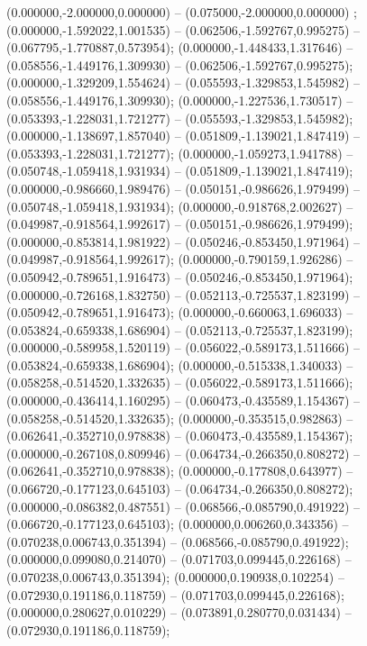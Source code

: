  (0.000000,-2.000000,0.000000) -- (0.075000,-2.000000,0.000000) ;
 (0.000000,-1.592022,1.001535) -- (0.062506,-1.592767,0.995275) -- (0.067795,-1.770887,0.573954);
 (0.000000,-1.448433,1.317646) -- (0.058556,-1.449176,1.309930) -- (0.062506,-1.592767,0.995275);
 (0.000000,-1.329209,1.554624) -- (0.055593,-1.329853,1.545982) -- (0.058556,-1.449176,1.309930);
 (0.000000,-1.227536,1.730517) -- (0.053393,-1.228031,1.721277) -- (0.055593,-1.329853,1.545982);
 (0.000000,-1.138697,1.857040) -- (0.051809,-1.139021,1.847419) -- (0.053393,-1.228031,1.721277);
 (0.000000,-1.059273,1.941788) -- (0.050748,-1.059418,1.931934) -- (0.051809,-1.139021,1.847419);
 (0.000000,-0.986660,1.989476) -- (0.050151,-0.986626,1.979499) -- (0.050748,-1.059418,1.931934);
 (0.000000,-0.918768,2.002627) -- (0.049987,-0.918564,1.992617) -- (0.050151,-0.986626,1.979499);
 (0.000000,-0.853814,1.981922) -- (0.050246,-0.853450,1.971964) -- (0.049987,-0.918564,1.992617);
 (0.000000,-0.790159,1.926286) -- (0.050942,-0.789651,1.916473) -- (0.050246,-0.853450,1.971964);
 (0.000000,-0.726168,1.832750) -- (0.052113,-0.725537,1.823199) -- (0.050942,-0.789651,1.916473);
 (0.000000,-0.660063,1.696033) -- (0.053824,-0.659338,1.686904) -- (0.052113,-0.725537,1.823199);
 (0.000000,-0.589958,1.520119) -- (0.056022,-0.589173,1.511666) -- (0.053824,-0.659338,1.686904);
 (0.000000,-0.515338,1.340033) -- (0.058258,-0.514520,1.332635) -- (0.056022,-0.589173,1.511666);
 (0.000000,-0.436414,1.160295) -- (0.060473,-0.435589,1.154367) -- (0.058258,-0.514520,1.332635);
 (0.000000,-0.353515,0.982863) -- (0.062641,-0.352710,0.978838) -- (0.060473,-0.435589,1.154367);
 (0.000000,-0.267108,0.809946) -- (0.064734,-0.266350,0.808272) -- (0.062641,-0.352710,0.978838);
 (0.000000,-0.177808,0.643977) -- (0.066720,-0.177123,0.645103) -- (0.064734,-0.266350,0.808272);
 (0.000000,-0.086382,0.487551) -- (0.068566,-0.085790,0.491922) -- (0.066720,-0.177123,0.645103);
 (0.000000,0.006260,0.343356) -- (0.070238,0.006743,0.351394) -- (0.068566,-0.085790,0.491922);
 (0.000000,0.099080,0.214070) -- (0.071703,0.099445,0.226168) -- (0.070238,0.006743,0.351394);
 (0.000000,0.190938,0.102254) -- (0.072930,0.191186,0.118759) -- (0.071703,0.099445,0.226168);
 (0.000000,0.280627,0.010229) -- (0.073891,0.280770,0.031434) -- (0.072930,0.191186,0.118759);
